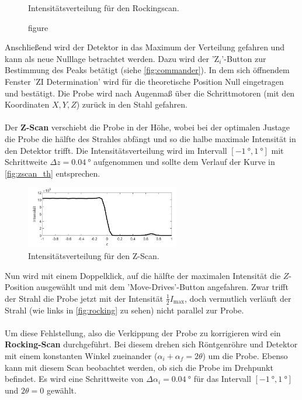 \begin{figure}[ht]
\begin{minipage}[b]{0.45\linewidth}
      \caption{figure}{Intensitätsverteilung für den Rockingscan.\cite[6]{anleitung}}
      \label{fig:rockingscan_th}
    \end{minipage}
\end{figure}
Anschließend wird der Detektor in das Maximum der Verteilung gefahren und kann als neue Nulllage betrachtet werden.
Dazu wird der '$\mathrm{Z}_i$'-Button zur Bestimmung des Peaks betätigt (siehe \autoref{fig:commander}).
In dem sich öffnendem Fenster 'ZI Determination' wird für die theoretische Position Null eingetragen und bestätigt.
Die Probe wird nach Augenmaß über die Schrittmotoren (mit den Koordinaten $X, Y, Z$) zurück in den Stahl gefahren.
\\
\\
Der \textbf{Z-Scan} verschiebt die Probe in der Höhe, wobei bei der optimalen Justage die Probe die hälfte des Strahles abfängt und so die halbe maximale Intensität in den Detektor trifft.
Die Intensitätsverteilung wird im Intervall $[\SI{-1}{\degree}, \SI{1}{\degree}]$ mit Schrittweite $\Delta z = \SI{0.04}{\degree}$ aufgenommen und sollte dem Verlauf der Kurve in \autoref{fig:zscan_th} entsprechen.
\begin{figure}
    \centering
    \includegraphics[width=0.6\textwidth]{content/data/zscan.jpg}
    \caption{Intensitätsverteilung für den Z-Scan.\cite[6]{anleitung}}
    \label{fig:zscan_th}
\end{figure}
Nun wird mit einem Doppelklick, auf die hälfte der maximalen Intensität die $Z$-Position ausgewählt und mit dem 'Move-Drives'-Button angefahren.
Zwar trifft der Strahl die Probe jetzt mit der Intensität $\frac{1}{2}I_\text{max}$, doch vermutlich verläuft der Strahl (wie links in \autoref{fig:rocking} zu sehen) nicht parallel zur Probe.
\\
\\
Um diese Fehlstellung, also die Verkippung der Probe zu korrigieren wird ein \textbf{Rocking-Scan} durchgeführt.
Bei diesem drehen sich Röntgenröhre und Detektor mit einem konstanten Winkel zueinander ($\alpha_i + \alpha_f = 2 \theta$) um die Probe.
Ebenso kann mit diesem Scan beobachtet werden, ob sich die Probe im Drehpunkt befindet.
Es wird eine Schrittweite von $\Delta \alpha_i = \SI{0.04}{\degree}$ für das Intervall $[\SI{-1}{\degree}, \SI{1}{\degree}]$ und $2 \theta = 0$ gewählt.
